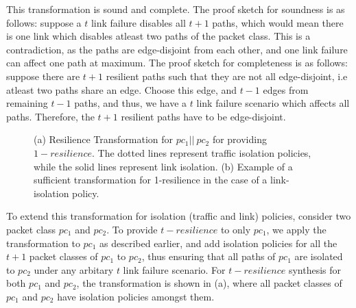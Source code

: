 This transformation is sound and complete. The proof sketch for soundness
 is as follows: suppose a $t$ link failure
disables all $t+1$ paths, which would mean there is one link which disables atleast two paths
of the packet class. This is a contradiction, as the paths are edge-disjoint from each other, and one
link failure can affect one path at maximum. The proof sketch for completeness is as follows:
suppose there are $t+1$ resilient paths such that they are not all edge-disjoint, i.e atleast two
paths share an edge. Choose this edge, and $t-1$ edges from remaining $t-1$ paths, and
thus, we have a $t$ link failure scenario which affects all paths. Therefore, the $t+1$ resilient
paths have to be edge-disjoint.
\begin{figure}
	\centering
	\caption{\label{fig:restransform}
		(a) Resilience Transformation for $pc_1 || \ pc_2$ for providing $1-resilience$. 
		The dotted lines represent traffic isolation policies, 
		while the solid lines represent link isolation. (b) Example of a sufficient transformation
		for 1-resilience in the case of a link-isolation policy.}
\end{figure}

To extend this transformation for isolation (traffic and link) policies, consider two packet class $pc_1$ 
and $pc_2$. 
To provide $t-resilience$ to only $pc_1$, we apply the transformation to $pc_1$ as described
earlier, and add isolation policies for all the $t+1$ packet classes of $pc_1$ to $pc_2$,
thus ensuring that all paths of $pc_1$ are isolated to $pc_2$ under any arbitary $t$ link 
failure scenario. For $t-resilience$ synthesis for both $pc_1$ and $pc_2$, the transformation
is shown in (a), where all packet classes of $pc_1$ and $pc_2$ have 
isolation policies amongst them. 

